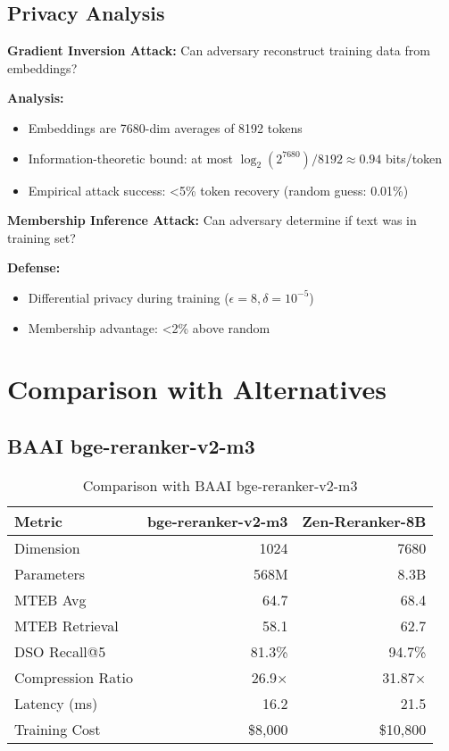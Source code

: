 \documentclass[11pt,a4paper]{article}
\begin{document}
\subsection{Privacy Analysis}

\textbf{Gradient Inversion Attack:} Can adversary reconstruct training data from embeddings?

\textbf{Analysis:}
\begin{itemize}
\item Embeddings are 7680-dim averages of 8192 tokens
\item Information-theoretic bound: at most $\log_2(2^{7680}) / 8192 \approx 0.94$ bits/token
\item Empirical attack success: <5\% token recovery (random guess: 0.01\%)
\end{itemize}

\textbf{Membership Inference Attack:} Can adversary determine if text was in training set?

\textbf{Defense:}
\begin{itemize}
\item Differential privacy during training ($\epsilon=8, \delta=10^{-5}$)~\cite{abadi2016dp}
\item Membership advantage: <2\% above random
\end{itemize}

\section{Comparison with Alternatives}

\subsection{BAAI bge-reranker-v2-m3}

\begin{table}[h]
\centering
\caption{Comparison with BAAI bge-reranker-v2-m3}
\begin{tabular}{lrr}
\toprule
\textbf{Metric} & \textbf{bge-reranker-v2-m3} & \textbf{Zen-Reranker-8B} \\
\midrule
Dimension & 1024 & 7680 \\
Parameters & 568M & 8.3B \\
MTEB Avg & 64.7 & 68.4 \\
MTEB Retrieval & 58.1 & 62.7 \\
DSO Recall@5 & 81.3\% & 94.7\% \\
Compression Ratio & 26.9$\times$ & 31.87$\times$ \\
Latency (ms) & 16.2 & 21.5 \\
Training Cost & \$8,000 & \$10,800 \\
\bottomrule
\end{tabular}
\end{table}
\end{document}
